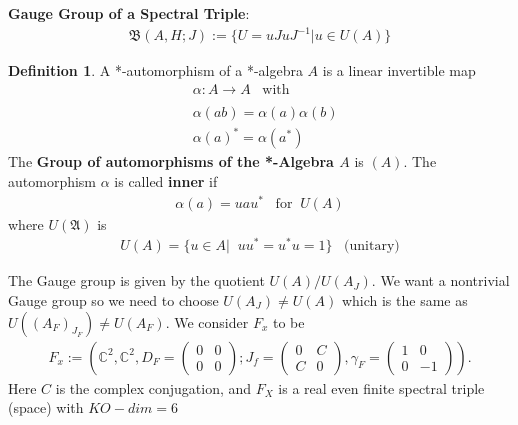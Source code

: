 \documentclass[a4paper]{article}
\theoremstyle{definition}
\newtheorem{definition}{Definition}
\theoremstyle{definition}
\theoremstyle{definition}
\theoremstyle{theorem}
\theoremstyle{theorem}
\theoremstyle{theorem}
\begin{document}
    \textbf{Gauge Group of a Spectral Triple}:
    \begin{align}
        \mathfrak{B}(A, H; J) := \{ U = uJuJ^{-1} | u\in U(A)\}
    \end{align}
    \begin{definition}
        A *-automorphism of a *-algebra $A$ is a linear invertible
        map
        \begin{align}
            &\alpha:A \rightarrow A\;\;\; \text{with}\\
            \nonumber\\
            &\alpha(ab) = \alpha(a)\alpha(b)\\
            &\alpha(a)^* = \alpha(a^*)
        \end{align}
        The \textbf{Group of automorphisms of the *-Algebra $A$} is
        $(A)$.\newline
        The automorphism $\alpha$ is called \textbf{inner} if
        \begin{align}
            \alpha(a) = u a u^* \;\;\; \text{for} \;\; U(A)
        \end{align}
        where $U(\mathfrak{A})$ is
        \begin{align}
            U(A) = \{ u\in A|\;\; uu^* = u^*u=1\} \;\;\;
            \text{(unitary)}
        \end{align}
    \end{definition}
    The Gauge group is given by the quotient $U(A)/U(A_J)$.
    We want a nontrivial Gauge group so we need to choose $U(A_J) \neq
    U(A)$ which is the same as $U((A_F)_{J_F}) \neq
    U(A_F)$.
    We consider $F_x$ to be
    \begin{align}
        F_x := \left(\mathbb{C}^2,\mathbb{C}^2, D_F =\begin{pmatrix}
            0&0\\0&0\end{pmatrix}; J_f =\begin{pmatrix}
        0&C\\C&0\end{pmatrix},
                \gamma_F = \begin{pmatrix}1&0\\0&-1\end{pmatrix}\right).
    \end{align}
    Here $C$ is the complex conjugation, and $F_X$ is a real even finite
        spectral triple (space) with $KO-dim=6$
\end{document}
